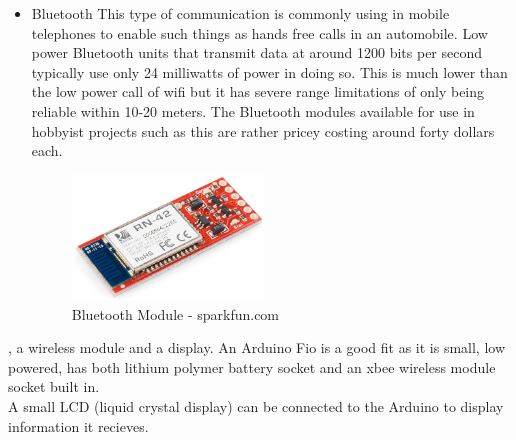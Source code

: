 \begin{itemize}
\item Bluetooth
This type of communication is commonly using in mobile telephones to enable such things as hands free calls in an automobile.  Low power Bluetooth units that transmit data at around 1200 bits per second typically use only 24 milliwatts of power in doing so.  This is much lower than the low power call of wifi but it has severe range limitations of only being reliable within 10-20 meters.  The Bluetooth modules available for use in hobbyist projects such as this are rather pricey costing around forty dollars each.
\begin{figure}[h]
\centering
        \includegraphics[width=2.0in] {Images/bluetooth.jpg}
        \caption{Bluetooth Module - sparkfun.com}
        \label{Bluetooth Module}
\end{figure}
\end{itemize}
, a wireless module and a display.
An Arduino Fio is a good fit as it is small, low powered, has both lithium polymer battery socket and an xbee wireless module socket built in.
\\A small LCD (liquid crystal display) can be connected to the Arduino to display information it recieves.

